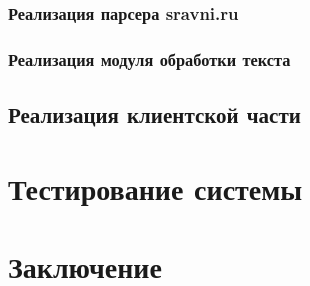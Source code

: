 \documentclass[PI, VKR]{HSEUniversity}
\begin{document}
\subsection{Реализация парсера sravni.ru}
\label{sec:org4e92f3d}
\subsection{Реализация модуля обработки текста}
\label{sec:org6ea1246}
\section{Реализация клиентской части}
\label{sec:orga48fd84}
\chapter{Тестирование системы}
\label{sec:org3ef9056}
\chapter*{Заключение}
\label{sec:org912c35e}
\putbibliography
\appendix
\end{document}
